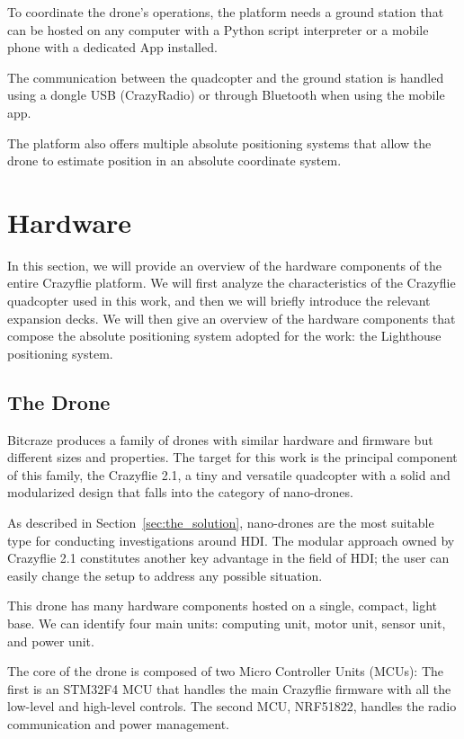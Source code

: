 To coordinate the drone's operations, the platform needs a ground station that can be hosted on any computer 
with a Python script interpreter or a mobile phone with a dedicated App installed. 

The communication between the quadcopter and the ground station is handled using a dongle USB (CrazyRadio) or through Bluetooth when using the mobile app.

The platform also offers multiple absolute positioning systems that allow the drone to estimate position in an absolute coordinate system.

\section{Hardware}\label{sec:crazyflie_hardware}
In this section, we will provide an overview of the hardware components of the entire Crazyflie platform. 
We will first analyze the characteristics of the Crazyflie quadcopter used in this work, and then we will briefly introduce the relevant expansion decks. 
We will then give an overview of the hardware components that compose the absolute positioning system adopted for the work: the Lighthouse positioning system.

\subsection{The Drone}\label{subsec:the_quadcopter}
Bitcraze produces a family of drones with similar hardware and firmware but different sizes and properties. 
The target for this work is the principal component of this family, the Crazyflie 2.1, a tiny and versatile quadcopter with a solid and modularized design that falls into the category of nano-drones.

As described in Section~\ref{sec:the_solution}, nano-drones are the most suitable type for conducting investigations around HDI. 
The modular approach owned by Crazyflie 2.1 constitutes another key advantage in the field of HDI; 
the user can easily change the setup to address any possible situation. 

This drone has many hardware components hosted on a single, compact, light base. 
We can identify four main units: computing unit, motor unit, sensor unit, and power unit.

The core of the drone is composed of two Micro Controller Units (MCUs): 
The first is an STM32F4 MCU that handles the main Crazyflie firmware with all the low-level and high-level controls. 
The second MCU, NRF51822, handles the radio communication and power management. 

